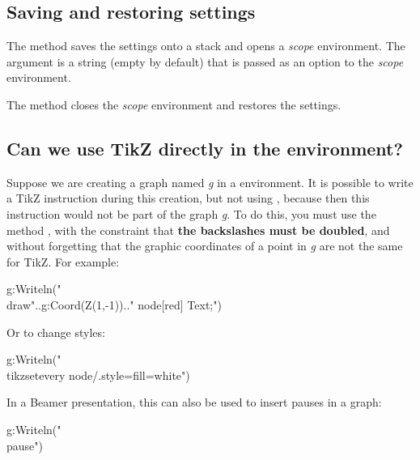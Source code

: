 \subsection{Saving and restoring settings}

The  method saves the \luadrawenv settings onto a stack and opens a \emph{scope} environment. The  argument is a string (empty by default) that is passed as an option to the \emph{scope} environment.

The  method closes the \emph{scope} environment and restores the \luadrawenv settings.

\subsection{Can we use TikZ directly in the \luadrawenv environment?}

Suppose we are creating a graph named \emph{g} in a \luadrawenv environment. It is possible to write a TikZ instruction during this creation, but not using , because then this instruction would not be part of the graph \emph{g}. To do this, you must use the method , with the constraint that \textbf{the backslashes must be doubled}, and without forgetting that the graphic coordinates of a point in \emph{g} are not the same for TikZ. For example:

\begin{Luacode}
g:Writeln("\\draw"..g:Coord(Z(1,-1)).." node[red] {Text};")
\end{Luacode}

Or to change styles:
\begin{Luacode}
g:Writeln("\\tikzset{every node/.style={fill=white}}")
\end{Luacode}

In a Beamer presentation, this can also be used to insert pauses in a graph:
\begin{Luacode}
g:Writeln("\\pause")
\end{Luacode}

